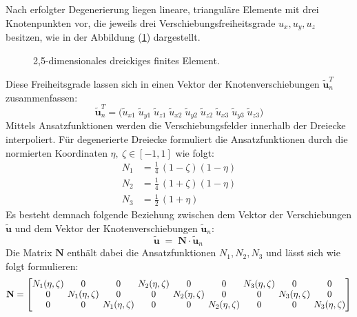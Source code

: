 Nach erfolgter Degenerierung liegen lineare, trianguläre Elemente mit drei Knotenpunkten vor, die jeweils drei Verschiebungsfreiheitsgrade \(u_x, u_y, u_z\) besitzen, wie in der Abbildung (\ref{fig:2,5dim_FE}) dargestellt.
\begin{figure}[H]
	\hspace*{47mm}
	
	\caption{2,5-dimensionales dreickiges finites Element.}
	\label{fig:2,5dim_FE}
\end{figure}
Diese Freiheitsgrade lassen sich in einen Vektor der Knotenverschiebungen $\tilde{\mathbf u}_{n}^{T}$ zusammenfassen:
\begin{equation}\label{eq:un_rowvec}
	\tilde{\mathbf u}_{n}^{T}
	=\bigl(\tilde{u}_{x1}\; \tilde{u}_{y1}\; \tilde{u}_{z1}\; \tilde{u}_{x2}\; \tilde{u}_{y2}\; \tilde{u}_{z2}\;
	\tilde{u}_{x3}\; \tilde{u}_{y3}\; \tilde{u}_{z3}\bigr)
\end{equation}
\clearpage
Mittels Ansatzfunktionen werden die Verschiebungsfelder innerhalb der Dreiecke interpoliert. Für degenerierte Dreiecke formuliert \cite{Zienkiewicz2013} die Ansatzfunktionen durch die normierten Koordinaten $\eta,\ \zeta \in [-1,1]$ wie folgt:
\begin{subequations}\label{eq:shape_functions}
	\begin{align}
		N_1 &= \frac{1}{4}\,(1-\zeta)(1-\eta) \label{eq:shape_funcs_a}\\
		N_2 &= \frac{1}{4}\,(1+\zeta)(1-\eta) \label{eq:shape_funcs_b}\\
		N_3 &= \frac{1}{2}\,(1+\eta)        \label{eq:shape_funcs_c}
	\end{align}
\end{subequations}
Es besteht demnach folgende Beziehung zwischen dem Vektor der Verschiebungen $\tilde{\mathbf u}$ und dem Vektor der Knotenverschiebungen $\tilde{\mathbf u}_{n}$:
\begin{equation}\label{eq:u_interp}
	\tilde{\mathbf u} \;=\; \mathbf N \cdot \tilde{\mathbf u}_{n}\,
\end{equation}
Die Matrix \(\mathbf{N}\) enthält dabei die Ansatzfunktionen $N_1, N_2, N_3$ und lässt sich wie folgt formulieren:
\begin{equation}\label{eq:N_matrix}
	\begingroup
	\setlength{\arraycolsep}{2pt}      %
	\renewcommand{\arraystretch}{0.95} %
	\mathbf N=
	\begin{bmatrix}
		N_1(\eta,\zeta)&0&0& N_2(\eta,\zeta)&0&0& N_3(\eta,\zeta)&0&0\\
		0&N_1(\eta,\zeta)&0& 0&N_2(\eta,\zeta)&0& 0&N_3(\eta,\zeta)&0\\
		0&0&N_1(\eta,\zeta)& 0&0&N_2(\eta,\zeta)& 0&0&N_3(\eta,\zeta)
	\end{bmatrix}
	\endgroup
\end{equation}

